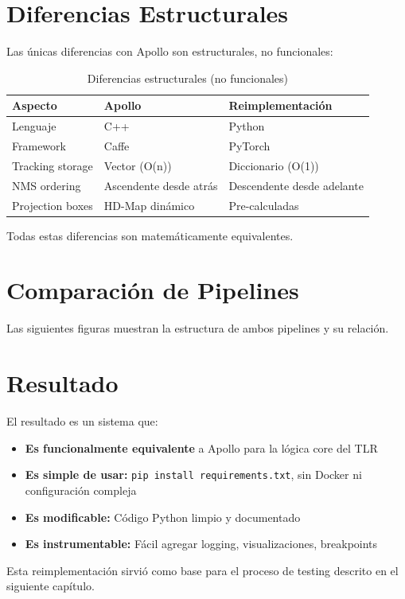 \section{Diferencias Estructurales}

Las únicas diferencias con Apollo son estructurales, no funcionales:

\begin{table}[H]
\centering
\begin{tabular}{|l|l|l|}
\hline
\textbf{Aspecto} & \textbf{Apollo} & \textbf{Reimplementación} \\
\hline
Lenguaje & C++ & Python \\
Framework & Caffe & PyTorch \\
Tracking storage & Vector (O(n)) & Diccionario (O(1)) \\
NMS ordering & Ascendente desde atrás & Descendente desde adelante \\
Projection boxes & HD-Map dinámico & Pre-calculadas \\
\hline
\end{tabular}
\caption{Diferencias estructurales (no funcionales)}
\end{table}

Todas estas diferencias son matemáticamente equivalentes.

\section{Comparación de Pipelines}

Las siguientes figuras muestran la estructura de ambos pipelines y su relación.



\section{Resultado}

El resultado es un sistema que:

\begin{itemize}
    \item \textbf{Es funcionalmente equivalente} a Apollo para la lógica core del TLR
    \item \textbf{Es simple de usar:} \texttt{pip install requirements.txt}, sin Docker ni configuración compleja
    \item \textbf{Es modificable:} Código Python limpio y documentado
    \item \textbf{Es instrumentable:} Fácil agregar logging, visualizaciones, breakpoints
\end{itemize}

Esta reimplementación sirvió como base para el proceso de testing descrito en el siguiente capítulo.